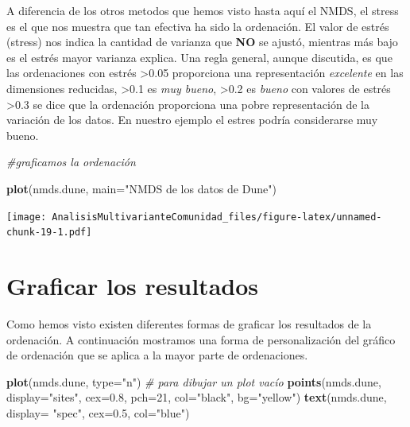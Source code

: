 \documentclass[]{book}
\newenvironment{Shaded}{\begin{snugshade}}{\end{snugshade}}
\newcommand{\KeywordTok}[1]{\textcolor[rgb]{0.13,0.29,0.53}{\textbf{{#1}}}}
\newcommand{\DataTypeTok}[1]{\textcolor[rgb]{0.13,0.29,0.53}{{#1}}}
\newcommand{\DecValTok}[1]{\textcolor[rgb]{0.00,0.00,0.81}{{#1}}}
\newcommand{\FloatTok}[1]{\textcolor[rgb]{0.00,0.00,0.81}{{#1}}}
\newcommand{\StringTok}[1]{\textcolor[rgb]{0.31,0.60,0.02}{{#1}}}
\newcommand{\CommentTok}[1]{\textcolor[rgb]{0.56,0.35,0.01}{\textit{{#1}}}}
\newcommand{\NormalTok}[1]{{#1}}
\begin{document}
A diferencia de los otros metodos que hemos visto hasta aquí el NMDS, el
stress es el que nos muestra que tan efectiva ha sido la ordenación. El
valor de estrés (stress) nos indica la cantidad de varianza que
\textbf{NO} se ajustó, mientras más bajo es el estrés mayor varianza
explica. Una regla general, aunque discutida, es que las ordenaciones
con estrés \textgreater{}0.05 proporciona una representación
\emph{excelente} en las dimensiones reducidas, \textgreater{}0.1 es
\emph{muy bueno}, \textgreater{}0.2 es \emph{bueno} con valores de
estrés \textgreater{}0.3 se dice que la ordenación proporciona una pobre
representación de la variación de los datos. En nuestro ejemplo el
estres podría considerarse muy bueno.

\begin{Shaded}
\begin{Highlighting}[]
\CommentTok{#graficamos la ordenación}

\KeywordTok{plot}\NormalTok{(nmds.dune, }\DataTypeTok{main=}\StringTok{"NMDS de los datos de Dune"}\NormalTok{)}
\end{Highlighting}
\end{Shaded}

\texttt{[image: AnalisisMultivarianteComunidad\_files/figure-latex/unnamed-chunk-19-1.pdf]}

\chapter{Graficar los resultados}\label{graficar-los-resultados}

Como hemos visto existen diferentes formas de graficar los resultados de
la ordenación. A continuación mostramos una forma de personalización del
gráfico de ordenación que se aplica a la mayor parte de ordenaciones.

\begin{Shaded}
\begin{Highlighting}[]
\KeywordTok{plot}\NormalTok{(nmds.dune, }\DataTypeTok{type=}\StringTok{"n"}\NormalTok{)  }\CommentTok{# para dibujar un plot vacío}
\KeywordTok{points}\NormalTok{(nmds.dune, }\DataTypeTok{display=}\StringTok{"sites"}\NormalTok{, }\DataTypeTok{cex=}\FloatTok{0.8}\NormalTok{, }\DataTypeTok{pch=}\DecValTok{21}\NormalTok{, }\DataTypeTok{col=}\StringTok{"black"}\NormalTok{, }\DataTypeTok{bg=}\StringTok{"yellow"}\NormalTok{)  }
\KeywordTok{text}\NormalTok{(nmds.dune, }\DataTypeTok{display=} \StringTok{"spec"}\NormalTok{, }\DataTypeTok{cex=}\FloatTok{0.5}\NormalTok{, }\DataTypeTok{col=}\StringTok{"blue"}\NormalTok{) }
\end{Highlighting}
\end{Shaded}
\end{document}
